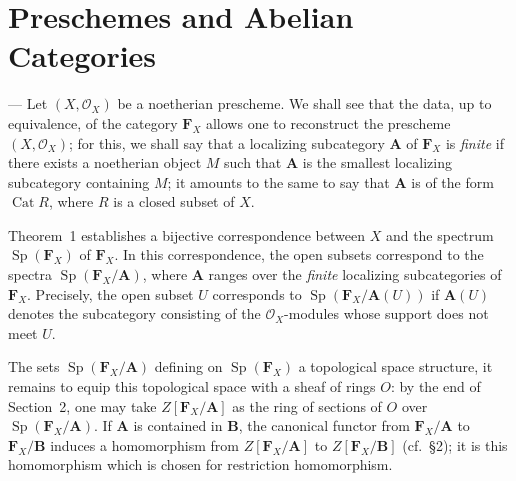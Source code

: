 %
%

\section{Preschemes and Abelian Categories}

--- Let $(X, \mathcal{O}_X)$ be a noetherian prescheme. We shall see
that the data, up to equivalence, of the category $\mathbf{F}_X$ allows
one to reconstruct the prescheme $(X, \mathcal{O}_X)$; for this, we
shall say that a localizing subcategory $\mathbf{A}$ of
$\mathbf{F}_X$ is \emph{finite} if there exists a noetherian object $M$
such that $\mathbf{A}$ is the smallest localizing subcategory
containing $M$; it amounts to the same to say that $\mathbf{A}$ is of
the form $\operatorname{Cat} R$, where $R$ is a closed subset of $X$.

Theorem~1 establishes a bijective correspondence between $X$ and the
spectrum $\operatorname{Sp}(\mathbf{F}_X)$ of $\mathbf{F}_X$. In this
correspondence, the open subsets correspond to the spectra
$\operatorname{Sp}(\mathbf{F}_X/\mathbf{A})$, where $\mathbf{A}$ ranges
over the \emph{finite} localizing subcategories of $\mathbf{F}_X$.
Precisely, the open subset $U$ corresponds to
$\operatorname{Sp}(\mathbf{F}_X/\mathbf{A}(U))$ if $\mathbf{A}(U)$
denotes the subcategory consisting of the $\mathcal{O}_X$-modules whose
support does not meet $U$.

The sets $\operatorname{Sp}(\mathbf{F}_X/\mathbf{A})$ defining on
$\operatorname{Sp}(\mathbf{F}_X)$ a topological space structure, it
remains to equip this topological space with a sheaf of rings $O$: by
the end of Section~2, one may take $Z[\mathbf{F}_X/\mathbf{A}]$ as the
ring of sections of $O$ over
$\operatorname{Sp}(\mathbf{F}_X/\mathbf{A})$. If $\mathbf{A}$ is
contained in $\mathbf{B}$, the canonical functor from
$\mathbf{F}_X/\mathbf{A}$ to $\mathbf{F}_X/\mathbf{B}$ induces a
homomorphism from $Z[\mathbf{F}_X/\mathbf{A}]$ to
$Z[\mathbf{F}_X/\mathbf{B}]$ (cf.\ \S2); it is this homomorphism which
is chosen for restriction homomorphism.
